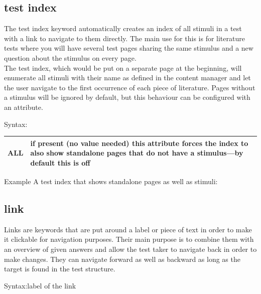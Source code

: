 \documentclass[12pt]{article} %
\newenvironment{keyword}{\leavevmode\color{magenta}}{}
\newenvironment{properties}
	{
    	\footnotesize\renewcommand{\arraystretch}{1.30}
  		\renewcommand{\tabcolsep}{0pt}
   		\begin{longtable}{>{\begin{keyword}}p{3.1cm}<{\end{keyword}}p{13.9cm}}
    	\hline
	}
	{
		\hline\end{longtable}\vspace{5mm}
	}
\begin{document}
\subsection{test index}\label{subsec:test-index}

The test index keyword automatically creates an index of all stimuli in a test with a link to navigate to them directly.
The main use for this is for literature tests where you will have several test pages sharing the same stimulus and a new question about the stimulus on every page. \\

The test index, which would be put on a separate page at the beginning, will enumerate all stimuli with their name as defined in the content manager and let the user navigate to the first occurrence of each piece of literature.
Pages without a stimulus will be ignored by default, but this behaviour can be configured with an attribute.

Syntax:\hspace{0.5cm}\kw{[@INDEX ... @]}

\begin{properties}
\hline
ALL & if present (no value needed) this attribute forces the index to also show standalone pages that do not have a stimulus—by default this is off\\
\hline
\end{properties}
\vspace{0.1cm}

\begin{exampleBox}{Example}
	A test index that shows standalone pages as well as stimuli:\\
\end{exampleBox}

\subsection{link}\label{subsec:link}

Links are keywords that are put around a label or piece of text in order to make it clickable for navigation purposes.
Their main purpose is to combine them with an overview of given answers and allow the test taker to navigate back in order to make changes.
They can navigate forward as well as backward as long as the target is found in the test structure.

Syntax:\hspace{0.5cm}\kw{[@LINK ... @]}label of the link\kw{[@/LINK@]}
\end{document}
